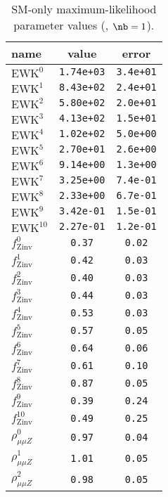 \begin{table}\centering
\caption{SM-only maximum-likelihood parameter values (\njetlow, $\nb = 1$).}
\label{tab:mlParameterValues1b_le3j}
\begin{tabular}{lcc}name & value & error \\ \hline
$\mathrm{EWK}^{0}$ & {\tt  1.74e+03} & {\tt  3.4e+01}\\
$\mathrm{EWK}^{1}$ & {\tt  8.43e+02} & {\tt  2.4e+01}\\
$\mathrm{EWK}^{2}$ & {\tt  5.80e+02} & {\tt  2.0e+01}\\
$\mathrm{EWK}^{3}$ & {\tt  4.13e+02} & {\tt  1.5e+01}\\
$\mathrm{EWK}^{4}$ & {\tt  1.02e+02} & {\tt  5.0e+00}\\
$\mathrm{EWK}^{5}$ & {\tt  2.70e+01} & {\tt  2.6e+00}\\
$\mathrm{EWK}^{6}$ & {\tt  9.14e+00} & {\tt  1.3e+00}\\
$\mathrm{EWK}^{7}$ & {\tt  3.25e+00} & {\tt  7.4e-01}\\
$\mathrm{EWK}^{8}$ & {\tt  2.33e+00} & {\tt  6.7e-01}\\
$\mathrm{EWK}^{9}$ & {\tt  3.42e-01} & {\tt  1.5e-01}\\
$\mathrm{EWK}^{10}$ & {\tt  2.27e-01} & {\tt  1.2e-01}\\
$f_\mathrm{Zinv}^{0}$ & {\tt 0.37} & {\tt 0.02}\\
$f_\mathrm{Zinv}^{1}$ & {\tt 0.42} & {\tt 0.03}\\
$f_\mathrm{Zinv}^{2}$ & {\tt 0.40} & {\tt 0.03}\\
$f_\mathrm{Zinv}^{3}$ & {\tt 0.44} & {\tt 0.03}\\
$f_\mathrm{Zinv}^{4}$ & {\tt 0.53} & {\tt 0.03}\\
$f_\mathrm{Zinv}^{5}$ & {\tt 0.57} & {\tt 0.05}\\
$f_\mathrm{Zinv}^{6}$ & {\tt 0.64} & {\tt 0.06}\\
$f_\mathrm{Zinv}^{7}$ & {\tt 0.61} & {\tt 0.10}\\
$f_\mathrm{Zinv}^{8}$ & {\tt 0.87} & {\tt 0.05}\\
$f_\mathrm{Zinv}^{9}$ & {\tt 0.39} & {\tt 0.24}\\
$f_\mathrm{Zinv}^{10}$ & {\tt 0.49} & {\tt 0.25}\\
$\rho_{\mu\mu Z}^{0}$ & {\tt 0.97} & {\tt 0.04}\\
$\rho_{\mu\mu Z}^{1}$ & {\tt 1.01} & {\tt 0.05}\\
$\rho_{\mu\mu Z}^{2}$ & {\tt 0.98} & {\tt 0.05}\\

\end{tabular}
\end{table}
